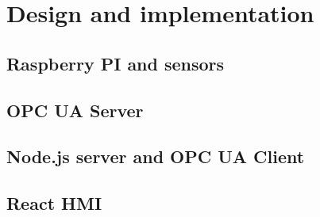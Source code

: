 \chapter{Design and implementation}
\section{Raspberry PI and sensors}
\section{OPC UA Server}
\section{Node.js server and OPC UA Client}
\section{React HMI}
